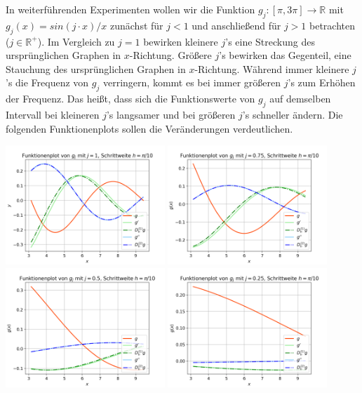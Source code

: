 \documentclass{scrartcl}
\begin{document}
In weiterführenden Experimenten wollen wir die Funktion $g_j:[\pi, 3\pi] \rightarrow \mathbb{R}$ mit $g_j(x) = sin(j\cdot x)/x$ zunächst für $j<1$ und anschließend für $j>1$ betrachten ($j \in \mathbb{R^{+}}$). Im Vergleich zu $j = 1$ bewirken kleinere $j$'s eine Streckung des ursprünglichen Graphen in $x$-Richtung. Größere $j$'s bewirken das Gegenteil, eine Stauchung des ursprünglichen Graphen in $x$-Richtung. Während immer kleinere $j$'s die Frequenz von $g_j$ verringern, kommt es bei immer größeren $j$'s zum Erhöhen der Frequenz. Das heißt, dass sich die Funktionswerte von $g_j$ auf demselben Intervall bei kleineren $j$'s langsamer und bei größeren $j$'s schneller ändern. Die folgenden Funktionenplots sollen die Veränderungen verdeutlichen.

\vspace{0.4cm}
{
  \centering
    \includegraphics[width=0.45\textwidth]{Grafiken/Funktionenplot_j1_Pi_Zehntel}
    \includegraphics[width=0.45\textwidth]{Grafiken/Funktionenplot_j075_Pi_Zehntel}\\
    \includegraphics[width=0.45\textwidth]{Grafiken/Funktionenplot_j05_Pi_Zehntel}
    \includegraphics[width=0.45\textwidth]{Grafiken/Funktionenplot_j025_Pi_Zehntel}\\
}
\end{document}
